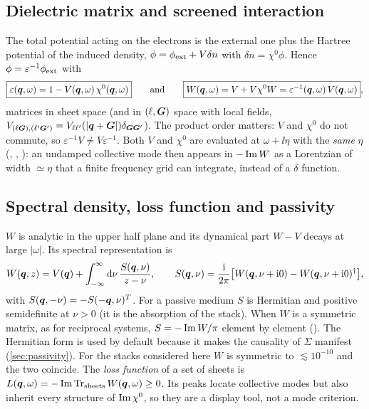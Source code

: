 \subsection{Dielectric matrix and screened interaction}

The total potential acting on the electrons is the external one plus the Hartree potential of the induced
density, $\phi=\phi_{\rm ext}+V\delta n$ with $\delta n=\chi^0\phi$. Hence $\phi=\varepsilon^{-1}\phi_{\rm ext}$ with
\begin{equation}
\boxed{\varepsilon(\bm q,\omega)=1-V(\bm q,\omega)\,\chi^0(\bm q,\omega)}
\qquad\text{and}\qquad
\boxed{W(\bm q,\omega)=V+V\chi^0W=\varepsilon^{-1}(\bm q,\omega)\,V(\bm q,\omega)} ,
\label{eq:epsW}
\end{equation}
matrices in sheet space (and in $(\ell,\bm G)$ space with local fields, $V_{(\ell\bm G),(\ell'\bm G')}=V_{\ell\ell'}(|\bm q+\bm G|)\delta_{\bm G\bm G'}$).
The product order matters: $V$ and $\chi^0$ do not commute, so $\varepsilon^{-1}V\ne V\varepsilon^{-1}$.
Both $V$ and $\chi^0$ are evaluated at $\omega+\ii\eta$ with the \emph{same} $\eta$
(, ,
): an undamped collective mode then appears in $-\operatorname{Im} W$ as a Lorentzian of
width $\simeq\eta$ that a finite frequency grid can integrate, instead of a $\delta$ function.

\subsection{Spectral density, loss function and passivity}
\label{sec:spectraldensity}

$W$ is analytic in the upper half plane and its dynamical part $W-V$ decays at large $|\omega|$. Its spectral
representation is
\begin{equation}
W(\bm q,z)=V(\bm q)+\int_{-\infty}^{\infty}\mathrm d\nu\,\frac{S(\bm q,\nu)}{z-\nu},\qquad
S(\bm q,\nu)=\frac{\mathrm i}{2\pi}\bigl[W(\bm q,\nu+\mathrm i0)-W(\bm q,\nu+\mathrm i0)^\dagger\bigr],
\label{eq:spectralrep}
\end{equation}
with $S(\bm q,-\nu)=-S(-\bm q,\nu)^{T}$. For a passive medium $S$ is Hermitian and positive semidefinite at $\nu>0$
(it is the absorption of the stack). When $W$ is a symmetric matrix, as for reciprocal systems,
$S=-\operatorname{Im} W/\pi$ element by element (). The Hermitian form is
used by default because it makes the causality of $\Sigma$ manifest (\cref{sec:passivity}). For the stacks considered here $W$ is symmetric to
$\lesssim10^{-10}$ and the two coincide. The \emph{loss function} of a set of sheets is
$L(\bm q,\omega)=-\operatorname{Im}\operatorname{Tr}_{\rm sheets}W(\bm q,\omega)\ge0$. Its peaks locate collective modes but also inherit every
structure of $\operatorname{Im}\chi^0$, so they are a display tool, not a mode criterion.

